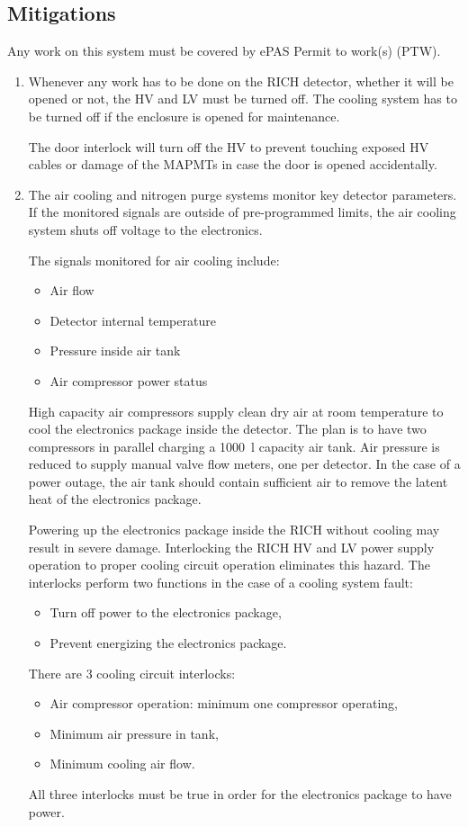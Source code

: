 \subsection{Mitigations}
Any work on this system must be covered by ePAS Permit to work(s) (PTW).
\begin{enumerate}
\item Whenever any work has to be done on the RICH detector, whether it will be opened or not, the 
HV and LV must be turned off. The cooling system has to be turned off if the enclosure is opened 
for maintenance. 

The door interlock will turn off the HV to prevent touching exposed HV cables or damage of the MAPMTs 
in case the door is opened accidentally.

\item The air cooling and nitrogen purge systems monitor key detector parameters. If the monitored 
signals are outside of pre-programmed limits, the air cooling system shuts off voltage to the 
electronics.

The signals monitored for air cooling include:
\begin{itemize}
\item Air flow
\item Detector internal temperature
\item Pressure inside air tank
\item Air compressor power status
\end{itemize}

High capacity air compressors supply clean dry air at room temperature to cool the electronics 
package inside the detector. The plan is to have two compressors in parallel charging a 1000~l 
capacity air tank. Air pressure is reduced to supply manual valve flow meters, one per detector. 
In the case of a power outage, the air tank should contain sufficient air to remove the latent 
heat of the electronics package.

Powering up the electronics package inside the RICH without cooling may result in severe damage. 
Interlocking the RICH HV and LV power supply operation to proper cooling circuit operation 
eliminates this hazard. The interlocks perform two functions in the case of a cooling system fault:
\begin{itemize}
\item Turn off power to the electronics package,
\item  Prevent energizing the electronics package.
\end{itemize}
There are 3 cooling circuit interlocks:
\begin{itemize}
\item Air compressor operation: minimum one compressor operating,
\item Minimum air pressure in tank,
\item Minimum cooling air flow.
\end{itemize}
All three interlocks must be true in order for the electronics package to have power.


\end{enumerate}
